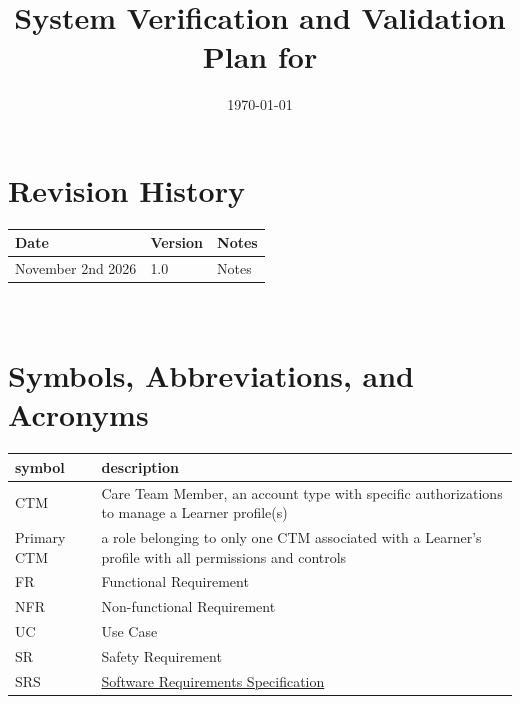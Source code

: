 \documentclass[12pt, titlepage]{article}
\begin{document}
\title{System Verification and Validation Plan for \progname{}} 
\author{\authname}
\date{\today}
	
\maketitle


\section*{Revision History}

\begin{tabularx}{\textwidth}{p{4cm}p{2cm}X}
\toprule {\bf Date} & {\bf Version} & {\bf Notes}\\
\midrule
November 2nd 2026 & 1.0 & Notes\\
\bottomrule
\end{tabularx}

~\\


\newpage

\tableofcontents

\listoftables


\newpage

\section{Symbols, Abbreviations, and Acronyms}

\renewcommand{\arraystretch}{1.2} 
\begin{tabular}{l p{13cm}}
\toprule 
\textbf{symbol} & \textbf{description}\\ 
\midrule 
CTM & Care Team Member, an account type with specific authorizations to manage a Learner profile(s)\\ 
Primary CTM & a role belonging to only one CTM associated with a Learner's profile with all permissions and controls\\ 
FR & Functional Requirement \\
NFR & Non-functional Requirement \\
UC & Use Case \\
SR & Safety Requirement \\
SRS & {\href{https://github.com/meena-alomran/game-n-grow/blob/main/pdfs/SRS-IEEE/SRS.pdf}{Software Requirements Specification}} \\
\bottomrule 
\end{tabular}
\end{document}
